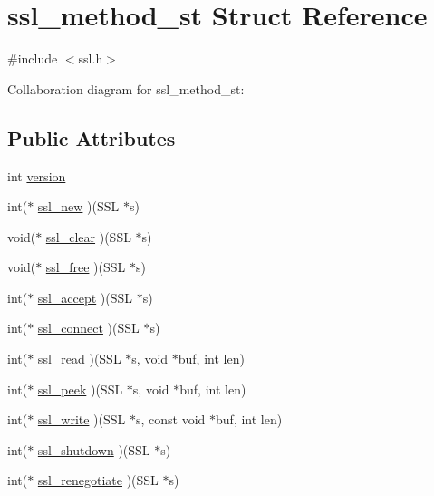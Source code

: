 \hypertarget{structssl__method__st}{\section{ssl\-\_\-method\-\_\-st Struct Reference}
\label{structssl__method__st}
}


{\ttfamily \#include $<$ssl.\-h$>$}



Collaboration diagram for ssl\-\_\-method\-\_\-st\-:
\subsection*{Public Attributes}
\begin{DoxyCompactItemize}
\item 
int \hyperlink{structssl__method__st_a1d231051899c943c03267d9ede6d2488}{version}
\item 
int($\ast$ \hyperlink{structssl__method__st_acaa00d8029276a73255202097f72d08e}{ssl\-\_\-new} )(S\-S\-L $\ast$s)
\item 
void($\ast$ \hyperlink{structssl__method__st_ae0c4287f13aabdbbb14ce63c48e820b2}{ssl\-\_\-clear} )(S\-S\-L $\ast$s)
\item 
void($\ast$ \hyperlink{structssl__method__st_aaa3352420812e9d4a769c42567bfc284}{ssl\-\_\-free} )(S\-S\-L $\ast$s)
\item 
int($\ast$ \hyperlink{structssl__method__st_a7252a63269f4108a1359e099bf24b93c}{ssl\-\_\-accept} )(S\-S\-L $\ast$s)
\item 
int($\ast$ \hyperlink{structssl__method__st_a6280860fde4074f8df0a2daf7bf211a5}{ssl\-\_\-connect} )(S\-S\-L $\ast$s)
\item 
int($\ast$ \hyperlink{structssl__method__st_a741f8e13c3d0cd4efe02bd3ada49810b}{ssl\-\_\-read} )(S\-S\-L $\ast$s, void $\ast$buf, int len)
\item 
int($\ast$ \hyperlink{structssl__method__st_a60436ba7ecb765f60d5bfd6abe50018a}{ssl\-\_\-peek} )(S\-S\-L $\ast$s, void $\ast$buf, int len)
\item 
int($\ast$ \hyperlink{structssl__method__st_a2828b8aad107d8eeed1a9525c22de276}{ssl\-\_\-write} )(S\-S\-L $\ast$s, const void $\ast$buf, int len)
\item 
int($\ast$ \hyperlink{structssl__method__st_a6965878add7a6a866cde2156d4aef5d1}{ssl\-\_\-shutdown} )(S\-S\-L $\ast$s)
\item 
int($\ast$ \hyperlink{structssl__method__st_af474c3e4e5290ad32871377dc31e91aa}{ssl\-\_\-renegotiate} )(S\-S\-L $\ast$s)

\end{DoxyCompactItemize}

